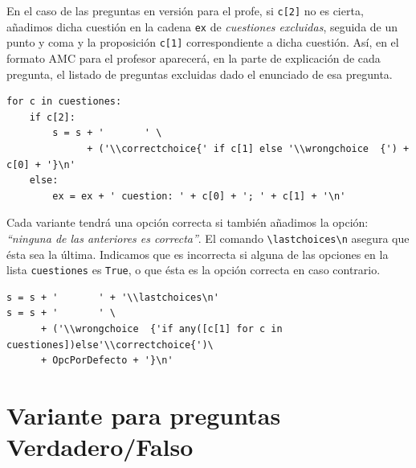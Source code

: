 \documentclass[10pt,a4paper]{report}
\begin{document}
En el caso de las preguntas en versión para el profe, si \texttt{c[2]} no es cierta, añadimos dicha cuestión en la cadena \texttt{ex} de \emph{cuestiones excluidas}, seguida de un punto y coma y la proposición \texttt{c[1]} correspondiente a dicha cuestión. 
Así, en el formato AMC para el profesor aparecerá, en la parte de explicación de cada pregunta, el listado de preguntas excluidas dado el enunciado de esa pregunta.

\begin{verbatim}
for c in cuestiones:
    if c[2]: 
        s = s + '       ' \
              + ('\\correctchoice{' if c[1] else '\\wrongchoice  {') + c[0] + '}\n'
    else:
        ex = ex + ' cuestion: ' + c[0] + '; ' + c[1] + '\n'
\end{verbatim}

Cada variante tendrá una opción correcta si también añadimos la opción: \emph{``ninguna de las anteriores es correcta''}. 
El comando \texttt{\textbackslash{}lastchoices\textbackslash{}n} asegura que ésta sea la última. 
Indicamos que es incorrecta si alguna de las opciones en la lista \texttt{cuestiones} es \texttt{True}, o que ésta es la opción correcta en caso contrario.
\begin{verbatim}
s = s + '       ' + '\\lastchoices\n'
s = s + '       ' \
      + ('\\wrongchoice  {'if any([c[1] for c in cuestiones])else'\\correctchoice{')\
      + OpcPorDefecto + '}\n'
\end{verbatim}
\section{Variante para preguntas Verdadero/Falso}
\label{sec:orgd7485b5}
\end{document}
